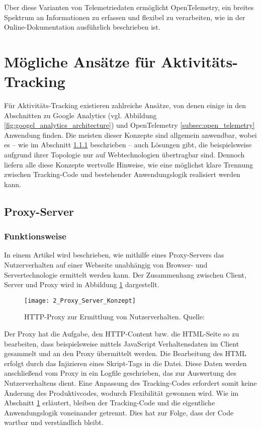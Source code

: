 Über diese Varianten von Telemetriedaten ermöglicht OpenTelemetry, ein breites Spektrum an Informationen zu erfassen und flexibel zu verarbeiten, wie in der Online-Dokumentation \cite{opentelemetry_what_is} ausführlich beschrieben ist.

\section{Mögliche Ansätze für Aktivitäts-Tracking}
\label{sec:solutions_tracking}

Für Aktivitäts-Tracking existieren zahlreiche Ansätze, von denen einige in den Abschnitten zu Google Analytics (vgl. Abbildung \ref{fig:googel_analytics_architecture}) und OpenTelemetry \ref{subsec:open_telemetry} Anwendung finden. Die meisten dieser Konzepte sind allgemein anwendbar, wobei es – wie im Abschnitt \ref{subsec:proxy_server} beschrieben – auch Lösungen gibt, die beispielsweise aufgrund ihrer Topologie nur auf Webtechnologien übertragbar sind. Dennoch liefern alle diese Konzepte wertvolle Hinweise, wie eine möglichst klare Trennung zwischen Tracking-Code und bestehender Anwendungslogik realisiert werden kann.

\subsection{Proxy-Server}

\subsubsection{Funktionsweise}
\label{subsec:proxy_server}
In einem Artikel \cite{atterer2006knowing} wird beschrieben, wie mithilfe eines Proxy-Servers das Nutzerverhalten auf einer Webseite unabhängig von Browser- und Servertechnologie ermittelt werden kann. Der Zusammenhang zwischen Client, Server und Proxy wird in Abbildung \ref{fig:proxy_server_concept} dargestellt.

\begin{figure}[H]
\centering
\texttt{[image: 2\_Proxy\_Server\_Konzept]}
\caption{HTTP-Proxy zur Ermittlung von Nutzerverhalten. Quelle: \cite{atterer2006knowing}}
\label{fig:proxy_server_concept}
\end{figure}

Der Proxy hat die Aufgabe, den HTTP-Content bzw. die HTML-Seite so zu bearbeiten, dass beispielsweise mittels JavaScript Verhaltensdaten im Client gesammelt und an den Proxy übermittelt werden. Die Bearbeitung des HTML erfolgt durch das Injizieren eines Skript-Tags in die Datei. Diese Daten werden anschließend vom Proxy in ein Logfile geschrieben, das zur Auswertung des Nutzerverhaltens dient. Eine Anpassung des Tracking-Codes erfordert somit keine Änderung des Produktivcodes, wodurch Flexibilität gewonnen wird. Wie im Abschnitt \ref{sec:solutions_tracking} erläutert, bleiben der Tracking-Code und die eigentliche Anwendungslogik voneinander getrennt. Dies hat zur Folge, dass der Code wartbar und verständlich bleibt.


